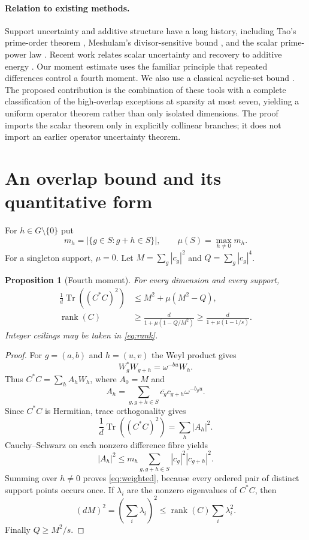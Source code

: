 \documentclass[11pt,a4paper]{article}
\newtheorem{proposition}[theorem]{Proposition}
\theoremstyle{remark}\newtheorem{remark}[theorem]{Remark}
\DeclareMathOperator{\rank}{rank}
\DeclareMathOperator{\Tr}{Tr}
\begin{document}
\paragraph{Relation to existing methods.}
Support uncertainty and additive structure have a long history, including Tao's prime-order theorem \cite{tao}, Meshulam's divisor-sensitive bound \cite{meshulam}, and the scalar prime-power law \cite{dvb}. Recent work relates scalar uncertainty and recovery to additive energy \cite{energy,refined}. Our moment estimate uses the familiar principle that repeated differences control a fourth moment. We also use a classical acyclic-set bound \cite{gruber}. The proposed contribution is the combination of these tools with a complete classification of the high-overlap exceptions at sparsity at most seven, yielding a uniform operator theorem rather than only isolated dimensions. The proof imports the scalar theorem only in explicitly collinear branches; it does not import an earlier operator uncertainty theorem.

\section{An overlap bound and its quantitative form}
For $h\in G\setminus\{0\}$ put
\[
 m_h=|\{g\in S:g+h\in S\}|,\qquad
 \mu(S)=\max_{h\ne0}m_h.
\]
For a singleton support, $\mu=0$. Let $M=\sum_g|c_g|^2$ and $Q=\sum_g|c_g|^4$.

\begin{proposition}[Fourth moment]\label{prop:moment}
For every dimension and every support,
\begin{align}
 \frac1d\Tr((C^*C)^2)&\le M^2+\mu(M^2-Q),\label{eq:weighted}\\
 \rank(C)&\ge\frac{d}{1+\mu(1-Q/M^2)}
 \ge\frac{d}{1+\mu(1-1/s)}.\label{eq:rank}
\end{align}
Integer ceilings may be taken in \eqref{eq:rank}.
\end{proposition}
\begin{proof}
For $g=(a,b)$ and $h=(u,v)$ the Weyl product gives
\[
 W_g^*W_{g+h}=\omega^{-bu}W_h.
\]
Thus $C^*C=\sum_h A_hW_h$, where $A_0=M$ and
\[
 A_h=\sum_{g,g+h\in S}\overline{c_g}c_{g+h}\omega^{-b_gu}.
\]
Since $C^*C$ is Hermitian, trace orthogonality gives
\[
 \frac1d\Tr((C^*C)^2)=\sum_h|A_h|^2.
\]
Cauchy--Schwarz on each nonzero difference fibre yields
\[
 |A_h|^2\le m_h\sum_{g,g+h\in S}|c_g|^2|c_{g+h}|^2.
\]
Summing over $h\ne0$ proves \eqref{eq:weighted}, because every ordered pair of distinct support points occurs once. If $\lambda_i$ are the nonzero eigenvalues of $C^*C$, then
\[
 (dM)^2=\left(\sum_i\lambda_i\right)^2
 \le\rank(C)\sum_i\lambda_i^2.
\]
Finally $Q\ge M^2/s$.
\end{proof}
\end{document}
